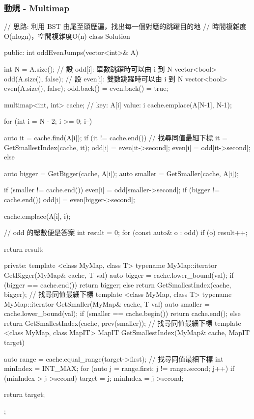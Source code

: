 \subsubsection{動規 - Multimap}
\begin{Code}
// 思路: 利用 BST 由尾至頭歷遍，找出每一個對應的跳躍目的地
// 時間複雜度O(nlogn)，空間複雜度O(n)
class Solution {
public:
    int oddEvenJumps(vector<int>& A) {
        int N = A.size();
        // 設 odd[i]: 單數跳躍時可以由 i 到 N
        vector<bool> odd(A.size(), false);
        // 設 even[i]: 雙數跳躍時可以由 i 到 N
        vector<bool> even(A.size(), false);
        odd.back() = even.back() = true;

        multimap<int, int> cache; // key: A[i] value: i
        cache.emplace(A[N-1], N-1);

        for (int i = N - 2; i >= 0; i--)
        {
            auto it = cache.find(A[i]);
            if (it != cache.end())
            {
                // 找尋同值最細下標
                it = GetSmallestIndex(cache, it);
                odd[i] = even[it->second];
                even[i] = odd[it->second];
            }
            else
            {
                auto bigger = GetBigger(cache, A[i]);
                auto smaller = GetSmaller(cache, A[i]);

                if (smaller != cache.end())
                    even[i] = odd[smaller->second];
                if (bigger != cache.end())
                    odd[i] = even[bigger->second];
            }
            cache.emplace(A[i], i);
        }

        // odd 的總數便是答案
        int result = 0;
        for (const auto& o : odd)
            if (o) result++;

        return result;
    }
private:
    template <class MyMap, class T>
        typename MyMap::iterator GetBigger(MyMap& cache, T val)
    {
        auto bigger = cache.lower_bound(val);
        if (bigger == cache.end())
            return bigger;
        else
            return GetSmallestIndex(cache, bigger); // 找尋同值最細下標
    }
    template <class MyMap, class T>
        typename MyMap::iterator GetSmaller(MyMap& cache, T val)
    {
        auto smaller = cache.lower_bound(val);
        if (smaller == cache.begin())
            return cache.end();
        else
            return GetSmallestIndex(cache, prev(smaller)); // 找尋同值最細下標
    }
    template <class MyMap, class MapIT>
        MapIT GetSmallestIndex(MyMap& cache, MapIT target)
    {
        auto range = cache.equal_range(target->first);
            // 找尋同值最細下標
            int minIndex = INT_MAX;
            for (auto j = range.first; j != range.second; j++)
            {
                if (minIndex > j->second)
                {
                    target = j;
                    minIndex = j->second;
                }
            }

        return target;
    }
};
\end{Code}


